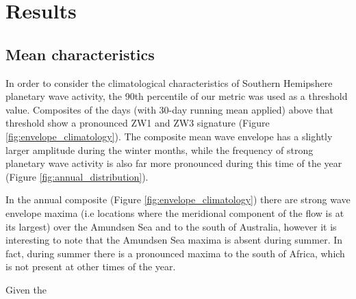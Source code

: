 \section{Results}

\subsection{Mean characteristics}

In order to consider the climatological characteristics of Southern Hemipshere planetary wave activity, the 90th percentile of our metric was used as a threshold value. Composites of the days (with 30-day running mean applied) above that threshold show a pronounced ZW1 and ZW3 signature (Figure \ref{fig:envelope_climatology}). The composite mean wave envelope has a slightly larger amplitude during the winter months, while the frequency of strong planetary wave activity is also far more pronounced during this time of the year (Figure \ref{fig:annual_distribution}).

In the annual composite (Figure \ref{fig:envelope_climatology}) there are strong wave envelope maxima (i.e locations where the meridional component of the flow is at its largest) over the Amundsen Sea and to the south of Australia, however it is interesting to note that the Amundsen Sea maxima is absent during summer. In fact, during summer there is a pronounced maxima to the south of Africa, which is not present at other times of the year.

Given the 



